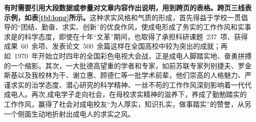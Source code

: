     {\bfseries 有时需要引用大段数据或参量对文章内容作出说明，用到跨页的表格。跨页三线表示例，如表\ref{tbl:long}所示。}这种求实风格和气质的形成，首先得益于学校一贯倡导的“团结、勤奋、求实、创新”的优良作风，使成电形成了务实的工作作风和实事求是的科学态度，即使在十年“文革”期间，也取得了承担科研课题~237~项、获得成果~60~余项、发表论文~500~余篇这样在全国高校中较为突出的成就；再如~1970~年开始立时四年的全国彩色电视大会战，正是成电人脚踏实地、奋勇拼搏的一个缩影。其次，一大批德高望重的学者和专家，如前苏联专家列别捷夫、罗金斯基以及我校林为干、谢立惠、顾德仁等一批学术前辈，他们崇高的人格魅力、严谨求实的治学态度、潜心研究的科学精神、一丝不苟的工作作风深刻影响着一代代成电人。再次,成电学子走向社会，在母校求实精神的滋养下，养成了勤勉踏实的工作作风，赢得了社会对成电校友“为人厚实，知识扎实，做事踏实”的赞誉，从另一个侧面生动地折射出成电人的求实之风。

